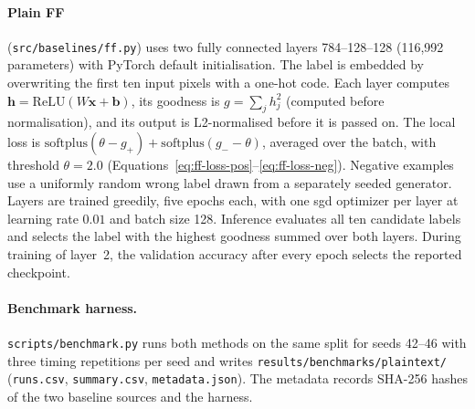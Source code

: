 \paragraph{Plain FF} (\texttt{src/\allowbreak baselines/\allowbreak ff.py}) uses two fully connected layers 784--128--128 (116{,}992 parameters) with PyTorch default initialisation. The label is embedded by overwriting the first ten input pixels with a one-hot code. Each layer computes $\mathbf{h}=\mathrm{ReLU}(W\mathbf{x}+\mathbf{b})$, its goodness is $g=\sum_j h_j^2$ (computed before normalisation), and its output is L2-normalised before it is passed on. The local loss is $\mathrm{softplus}(\theta-g_{+})+\mathrm{softplus}(g_{-}-\theta)$, averaged over the batch, with threshold $\theta=2.0$ (Equations~\eqref{eq:ff-loss-pos}--\eqref{eq:ff-loss-neg}). Negative examples use a uniformly random wrong label drawn from a separately seeded generator. Layers are trained greedily, five epochs each, with one \ac{sgd} optimizer per layer at learning rate $0.01$ and batch size 128. Inference evaluates all ten candidate labels and selects the label with the highest goodness summed over both layers. During training of layer~2, the validation accuracy after every epoch selects the reported checkpoint.

\paragraph{Benchmark harness.} \texttt{scripts/\allowbreak benchmark.py} runs both methods on the same split for seeds 42--46 with three timing repetitions per seed and writes \texttt{results/\allowbreak benchmarks/\allowbreak plaintext/} (\texttt{runs.csv}, \texttt{summary.csv}, \texttt{metadata.json}). The metadata records SHA-256 hashes of the two baseline sources and the harness.

